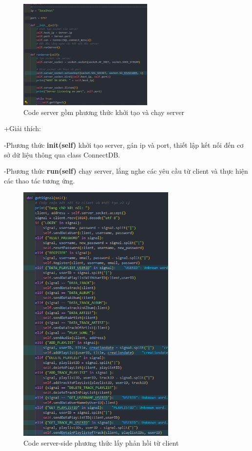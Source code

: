 \documentclass[a4paper]{article}
\begin{document}
\clearpage
\newpage
\begin{flushleft}
	\begin{figure}[h]
		\centering
		\includegraphics[width=0.6\textwidth]{images/Server-establishment.png}
		\caption{Code server gồm phương thức khởi tạo và chạy server}
	\end{figure}
	+Giải thích:

	-Phương thức \textbf{init(self)} khởi tạo server, gán ip và port, thiết lập kết nối đến cơ sở dữ liệu thông qua class ConnectDB.

	-Phương thức \textbf{run(self)} chạy server, lắng nghe các yêu cầu từ client và thực hiện các thao tác tương ứng.
\end{flushleft}
\clearpage
\newpage
\begin{figure}
	\centering
	\includegraphics[width=0.7\textwidth]{images/getSignal-server.png}
	\caption{Code server-side phương thức lấy phản hồi từ client}
\end{figure}
\end{document}
